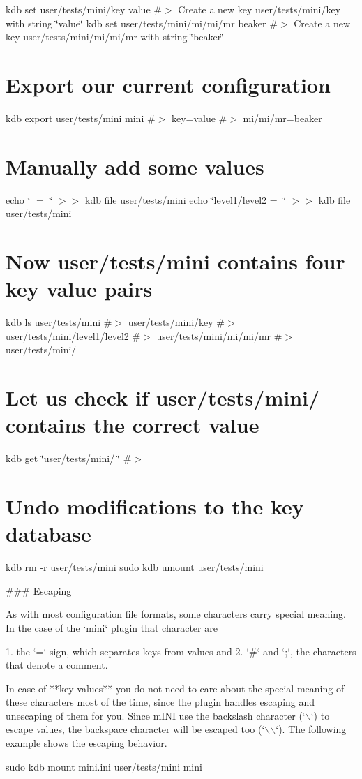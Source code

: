 kdb set user/tests/mini/key value \#$>$ Create a new key user/tests/mini/key with string \char`\"{}value\char`\"{} kdb set user/tests/mini/mi/mi/mr beaker \#$>$ Create a new key user/tests/mini/mi/mi/mr with string \char`\"{}beaker\char`\"{}

\section*{Export our current configuration}

kdb export user/tests/mini mini \#$>$ key=value \#$>$ mi/mi/mr=beaker

\section*{Manually add some values}

echo \char`\"{}🔑 = 🦄\char`\"{} $>$$>$ {\ttfamily kdb file user/tests/mini} echo \char`\"{}level1/level2 = 👾\char`\"{} $>$$>$ {\ttfamily kdb file user/tests/mini}

\section*{Now {\ttfamily user/tests/mini} contains four key value pairs}

kdb ls user/tests/mini \#$>$ user/tests/mini/key \#$>$ user/tests/mini/level1/level2 \#$>$ user/tests/mini/mi/mi/mr \#$>$ user/tests/mini/🔑

\section*{Let us check if {\ttfamily user/tests/mini/🔑} contains the correct value}

kdb get \char`\"{}user/tests/mini/🔑\char`\"{} \#$>$ 🦄

\section*{Undo modifications to the key database}

kdb rm -\/r user/tests/mini sudo kdb umount user/tests/mini 
\begin{DoxyCode}
### Escaping

As with most configuration file formats, some characters carry special meaning. In the case of the `mini`
       plugin that character are

1. the `=` sign, which separates keys from values and
2. `#` and `;`, the characters that denote a comment.

In case of **key values** you do not need to care about the special meaning of these characters most of the
       time, since the plugin handles escaping and unescaping of them for you. Since mINI use the backslash
       character (`\(\backslash\)`) to escape values, the backspace character will be escaped too (`\(\backslash\)\(\backslash\)`). The following example shows
       the escaping behavior.
\end{DoxyCode}
 sudo kdb mount mini.\+ini user/tests/mini mini

